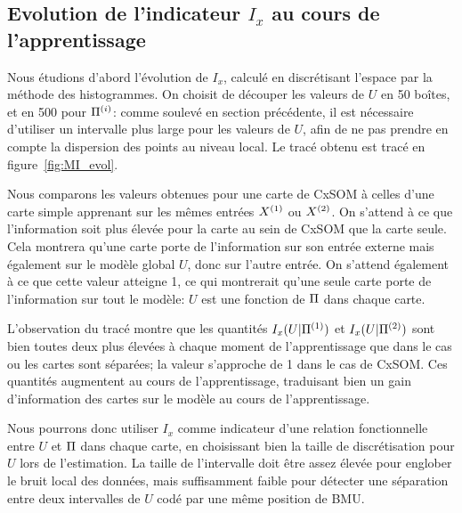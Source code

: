 \documentclass[../main]{subfiles}
\begin{document}
\subsection{Evolution de l'indicateur $I_x$ au cours de l'apprentissage}

Nous étudions d'abord l'évolution de $I_x$, calculé en discrétisant l'espace par la méthode des histogrammes.
On choisit de découper les valeurs de $U$ en 50 boîtes, et en 500 pour $\Pi^{({i})}$: comme soulevé en section précédente, il est nécessaire d'utiliser un intervalle plus large pour les valeurs de $U$, afin de ne pas prendre en compte la dispersion des points au niveau local. Le tracé obtenu est tracé en figure~\ref{fig:MI_evol}.

Nous comparons les valeurs obtenues pour une carte de CxSOM à celles d'une carte simple apprenant sur les mêmes entrées $X^{({1})}$ ou $X^{({2})}$.
On s'attend à ce que l'information soit plus élevée pour la carte au sein de CxSOM que la carte seule. Cela montrera qu'une carte porte de l'information sur son entrée externe mais également sur le modèle global $U$, donc sur l'autre entrée.
On s'attend également à ce que cette valeur atteigne 1, ce qui montrerait qu'une seule carte porte de l'information sur tout le modèle: $U$ est une fonction de $\Pi$ dans chaque carte.

L'observation du tracé montre que les quantités $I_x(U|\Pi^{({1})})$ et $I_x(U|\Pi^{({2})})$ sont bien toutes deux plus élevées à chaque moment de l'apprentissage que dans le cas ou les cartes sont séparées; la valeur s'approche de 1 dans le cas de CxSOM.
Ces quantités augmentent au cours de l'apprentissage, traduisant bien un gain d'information des cartes sur le modèle au cours de l'apprentissage.

Nous pourrons donc utiliser $I_x$ comme indicateur d'une relation fonctionnelle entre $U$ et $\Pi$ dans chaque carte, en choisissant bien la taille de discrétisation pour $U$ lors de l'estimation. La taille de l'intervalle doit être assez élevée pour englober le bruit local des données, mais suffisamment faible pour détecter une séparation entre deux intervalles de $U$ codé par une même position de BMU.
\end{document}

